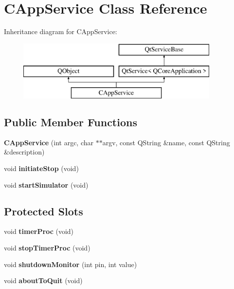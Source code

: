 \hypertarget{class_c_app_service}{}\section{C\+App\+Service Class Reference}
\label{class_c_app_service}
Inheritance diagram for C\+App\+Service\+:\begin{figure}[H]
\begin{center}
\leavevmode
\includegraphics[height=3.000000cm]{class_c_app_service}
\end{center}
\end{figure}
\subsection*{Public Member Functions}
\begin{DoxyCompactItemize}
\item 
\mbox{\label{class_c_app_service_a171ba461c80bca4e6680db9346a8a714}} 
{\bfseries C\+App\+Service} (int argc, char $\ast$$\ast$argv, const Q\+String \&name, const Q\+String \&description)
\item 
\mbox{\label{class_c_app_service_aacfe1e37a508cdd56f8d2eac067a47b1}} 
void {\bfseries initiate\+Stop} (void)
\item 
\mbox{\label{class_c_app_service_a874ab4caec71d84456c26ab8591b050c}} 
void {\bfseries start\+Simulator} (void)
\end{DoxyCompactItemize}
\subsection*{Protected Slots}
\begin{DoxyCompactItemize}
\item 
\mbox{\label{class_c_app_service_ace5b08ee3116b05088541e4a5eb16de8}} 
void {\bfseries timer\+Proc} (void)
\item 
\mbox{\label{class_c_app_service_a33eca01d991cd23abf0e262154121b53}} 
void {\bfseries stop\+Timer\+Proc} (void)
\item 
\mbox{\label{class_c_app_service_a49df3bd8fbc756aed18389d356e8a0f3}} 
void {\bfseries shutdown\+Monitor} (int pin, int value)
\item 
\mbox{\label{class_c_app_service_a0a775d5fefaab8570894bd229c834ed7}} 
void {\bfseries about\+To\+Quit} (void)
\end{DoxyCompactItemize}
